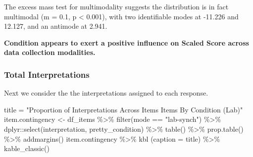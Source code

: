 \documentclass[
  letterpaper,
  DIV=11,
  numbers=noendperiod]{scrreprt}
\newenvironment{Shaded}{\begin{snugshade}}{\end{snugshade}}
\newcommand{\AttributeTok}[1]{\textcolor[rgb]{0.40,0.45,0.13}{#1}}
\newcommand{\FunctionTok}[1]{\textcolor[rgb]{0.28,0.35,0.67}{#1}}
\newcommand{\NormalTok}[1]{\textcolor[rgb]{0.00,0.23,0.31}{#1}}
\newcommand{\OtherTok}[1]{\textcolor[rgb]{0.00,0.23,0.31}{#1}}
\newcommand{\SpecialCharTok}[1]{\textcolor[rgb]{0.37,0.37,0.37}{#1}}
\newcommand{\StringTok}[1]{\textcolor[rgb]{0.13,0.47,0.30}{#1}}
\begin{document}
The excess mass test for multimodality suggests the distribution is in
fact multimodal (m = 0.1, p \textless{} 0.001), with two identifiable
modes at -11.226 and 12.127, and an antimode at 2.941.

\begin{tcolorbox}[enhanced jigsaw, toptitle=1mm, toprule=.15mm, bottomtitle=1mm, leftrule=.75mm, title=\textcolor{quarto-callout-note-color}{\faInfo}\hspace{0.5em}{Note}, opacityback=0, titlerule=0mm, opacitybacktitle=0.6, colframe=quarto-callout-note-color-frame, rightrule=.15mm, breakable, bottomrule=.15mm, colbacktitle=quarto-callout-note-color!10!white, coltitle=black, arc=.35mm, colback=white, left=2mm]
\textbf{Condition appears to exert a positive influence on Scaled Score
across data collection modalities.}
\end{tcolorbox}

\hypertarget{total-interpretations}{%
\subsubsection{Total Interpretations}\label{total-interpretations}}

Next we consider the the interpretations assigned to each response.

\begin{Shaded}
\begin{Highlighting}[]
\NormalTok{title }\OtherTok{=} \StringTok{"Proportion of Interpretations Across Items Items By Condition (Lab)"}
\NormalTok{item.contingency }\OtherTok{\textless{}{-}}\NormalTok{ df\_items }\SpecialCharTok{\%\textgreater{}\%} \FunctionTok{filter}\NormalTok{(mode }\SpecialCharTok{==} \StringTok{"lab{-}synch"}\NormalTok{) }\SpecialCharTok{\%\textgreater{}\%}\NormalTok{ dplyr}\SpecialCharTok{::}\FunctionTok{select}\NormalTok{(interpretation, pretty\_condition) }\SpecialCharTok{\%\textgreater{}\%} \FunctionTok{table}\NormalTok{() }\SpecialCharTok{\%\textgreater{}\%} \FunctionTok{prop.table}\NormalTok{() }\SpecialCharTok{\%\textgreater{}\%} \FunctionTok{addmargins}\NormalTok{()}
\NormalTok{item.contingency }\SpecialCharTok{\%\textgreater{}\%} \FunctionTok{kbl}\NormalTok{ (}\AttributeTok{caption =}\NormalTok{ title) }\SpecialCharTok{\%\textgreater{}\%} \FunctionTok{kable\_classic}\NormalTok{()}
\end{Highlighting}
\end{Shaded}
\end{document}
